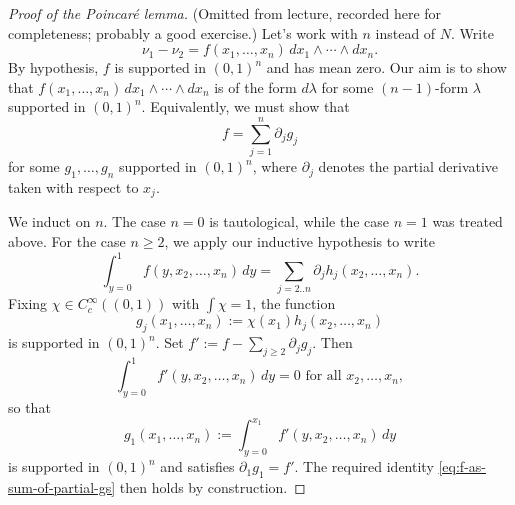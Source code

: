 \documentclass[reqno]{amsart} 
\begin{document}
\begin{proof}
[Proof of the Poincar{\'e} lemma]
  (Omitted from lecture, recorded here for completeness; probably a good exercise.)  Let's work with $n$ instead of $N$.  Write
  \begin{equation*}
    \nu_1 - \nu_2 = f(x_1,\dotsc,x_n) \, d x_1 \wedge \dotsb \wedge d x_n.
  \end{equation*}
  By hypothesis, $f$ is supported in $(0,1)^n$ and has mean zero.  Our aim is to show that $f(x_1,\dotsc,x_n) \, d x_1 \wedge \dotsb \wedge d x_n$ is of the form $d \lambda$ for some $(n-1)$-form $\lambda$ supported in $(0,1)^n$.  Equivalently, we must show that
  \begin{equation}\label{eq:f-as-sum-of-partial-gs}
    f = \sum_{j=1}^n \partial_j g_j
  \end{equation}
  for some $g_1,\dotsc,g_n$ supported in $(0,1)^n$, where $\partial_j$ denotes the partial derivative taken with respect to $x_j$.

  We induct on $n$.  The case $n = 0$ is tautological, while the case $n = 1$ was treated above.  For the case $n \geq 2$, we apply our inductive hypothesis to write
  \begin{equation*}
    \int_{y=0}^1 f(y,x_2,\dotsc,x_n) \, d y = \sum_{j=2..n} \partial_{j} h_j(x_2,\dotsc,x_n).
  \end{equation*}
  Fixing $\chi \in C_c^\infty((0,1))$ with $\int \chi = 1$, the function
  \begin{equation}\label{eq:}
    g_j(x_1,\dotsc,x_n) :=
    \chi(x_1) h_j(x_2,\dotsc,x_n)
  \end{equation}
  is supported in $(0,1)^n$.  Set $f' := f - \sum_{j \geq 2} \partial_j g_j$.  Then
  \begin{equation*}
    \int_{y=0}^1 f'(y,x_2,\dotsc,x_n) \, d y = 0 \text{ for all } x_2,\dotsc,x_n,
  \end{equation*}
  so that
  \begin{equation*}
    g_1(x_1,\dotsc,x_n) := \int_{y=0}^{x_1} f'(y,x_2,\dotsc,x_n) \, d y
  \end{equation*}
  is supported in $(0,1)^n$ and satisfies $\partial_1 g_1 = f'$.  The required identity \eqref{eq:f-as-sum-of-partial-gs} then holds by construction.
\end{proof}
\end{document}
